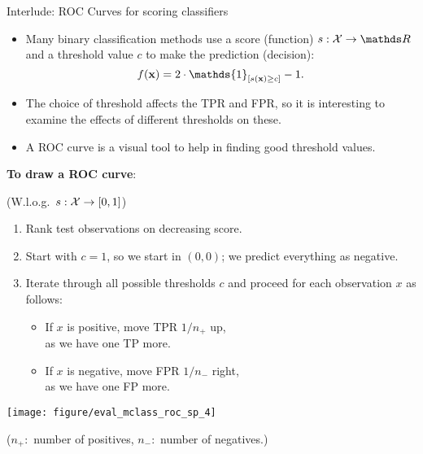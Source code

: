 \documentclass[11pt,compress,t,notes=noshow, xcolor=table]{beamer}
\begin{document}
\begin{vbframe}{Interlude: ROC Curves for scoring classifiers}
	\small
	\begin{itemize}
%		
		\item 	Many binary classification methods use a score (function) $s:\Xspace \to \R$ and a threshold value $c$ to make the prediction (decision):
		$$\fx = 2 \cdot \mathds{1}_{[ s(\xv) \ge c]} -1.$$
		\item The choice of threshold affects the TPR and FPR, so it is interesting to examine the effects of different thresholds on these.
		
		\item A ROC curve is a visual tool to help in finding good threshold values.
%		
	\end{itemize}
	
	\framebreak
	
	
	\textbf{To draw a ROC curve}:
	
	(W.l.o.g.\ $s:\mathcal{X} \to [0,1]$)
	
	\lz
	
	\begin{minipage}[b]{0.65\textwidth}
		\small
		\begin{enumerate}
			\item Rank test observations on decreasing score.
			\item Start with $c = 1$, so we start in $(0, 0)$; we predict everything as
			negative.
			\item Iterate through all possible thresholds $c$ and proceed for each
			observation $x$ as follows:
			\begin{itemize}
				\footnotesize
				\item If $x$ is positive, move TPR $1/n_+$ up, \\as we have one TP more.
				\item If $x$ is negative, move FPR $1/n_-$ right, \\as we have one FP  more.
			\end{itemize}
		\end{enumerate}
	\end{minipage}%
	\begin{minipage}[b]{0.35\textwidth}
		\centering
		\texttt{[image: figure/eval\_mclass\_roc\_sp\_4]}
	\end{minipage}
	
	\scriptsize($n_+:$ number of positives, $n_-:$ number of negatives.)
\end{vbframe}
\end{document}
